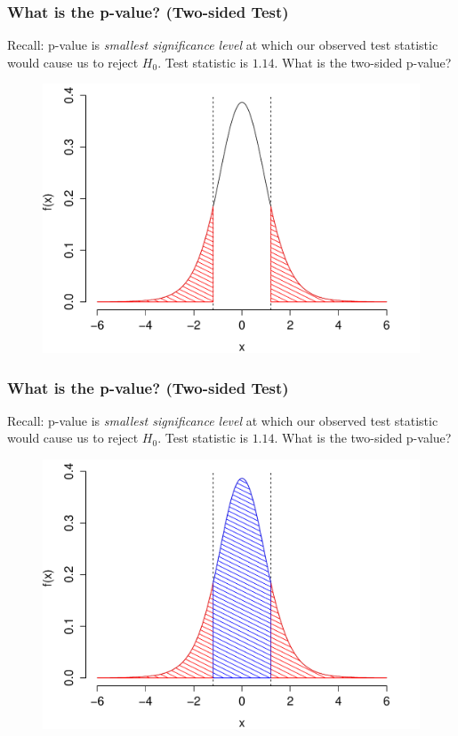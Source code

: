 \documentclass[handout]{beamer}
\begin{document}
\begin{frame}
\frametitle{What is the p-value? (Two-sided Test)}
\footnotesize
Recall: p-value is \emph{smallest significance level} at which our observed test statistic would cause us to reject $H_0$. \alert{Test statistic is $1.14$. What is the two-sided p-value? }
\begin{figure}
\includegraphics[scale= 0.4]{./images/p_both4}

\end{figure}

\end{frame}

\begin{frame}
\frametitle{What is the p-value? (Two-sided Test)}
\footnotesize
Recall: p-value is \emph{smallest significance level} at which our observed test statistic would cause us to reject $H_0$. \alert{Test statistic is $1.14$. What is the two-sided p-value? }
\begin{figure}
\includegraphics[scale= 0.4]{./images/p_both5}

\end{figure}

\end{frame}
\end{document}
